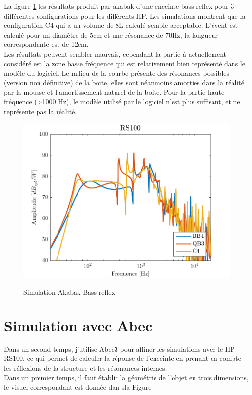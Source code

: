 \documentclass[a4paper,english]{report}
\begin{document}
				La figure \ref{simubassr} les résultats produit par akabak d'une enceinte bass reflex pour 3 différentes configurations pour les différents HP. Les simulations montrent que la configuration C4 qui a un volume de 8L calculé semble acceptable. L'évent est calculé pour un diamètre de 5cm et une résonance de 70Hz, la longueur correspondante est de 12cm.\\
				Les résultats peuvent sembler mauvais, cependant la partie à actuellement considéré est la zone basse fréquence qui est relativement bien représenté dans le modèle du logiciel. Le milieu de la courbe présente des résonances possibles (version non définitive) de la boite, elles sont néanmoins amorties dans la réalité par la mousse et l'amortissement naturel de la boite. Pour la partie haute fréquence (>1000 Hz), le modèle utilisé par le logiciel n'est plus suffisant, et ne représente pas la réalité.
			\begin{figure}[H]
				\centering
				\includegraphics[width=480px]{./Simulation/Akabak/simuAkabak.pdf}
				\label{simubassr}
				\caption{Simulation Akabak Bass reflex}
			\end{figure}


			\section{Simulation avec Abec}
			Dans un second temps, j'utilise Abec3 pour affiner les simulations avec le HP RS100, ce qui permet de calculer la réponse de l'enceinte en prenant en compte les réflexions de la structure et les résonances internes.\\
			Dans un premier temps, il faut établir la géométrie de l'objet en trois dimensions, le visuel correspondant est donnée dan sla Figure 
\end{document}
